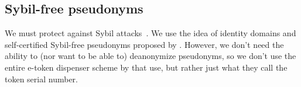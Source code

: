 \subsection{Sybil-free pseudonyms}%
\label{sybil-free-pseudonyms}

We must protect against Sybil attacks~\cite{SybilAttack}.
We use the idea of identity domains and self-certified Sybil-free pseudonyms 
proposed by \textcite{SelfCertifiedSybilFreePseudonyms}.
However, we don't need the ability to (nor want to be able to) deanonymize 
pseudonyms, so we don't use the entire e-token dispenser scheme by 
\textcite{HowToWinTheCloneWars} that 
\textcite{SelfCertifiedSybilFreePseudonyms} use, but rather just what they call 
the token serial number.
